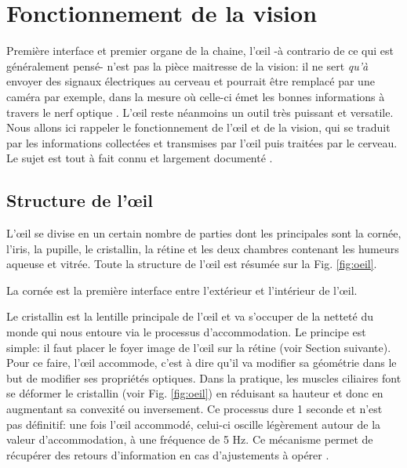 \chapter{Fonctionnement de la vision}
\par Première interface et premier organe de la chaine, l'œil -à contrario de ce qui est généralement pensé- n'est pas la pièce maitresse de la vision: il ne sert \textit{qu'à} envoyer des signaux électriques au cerveau et pourrait être remplacé par une caméra par exemple, dans la mesure où celle-ci émet les bonnes informations à travers le nerf optique \citep{dobelle_artificial_2000}. L'œil reste néanmoins un outil très puissant et versatile. Nous allons ici rappeler le fonctionnement de l'œil et de la vision, qui se traduit par les informations collectées et transmises par l'œil puis traitées par le cerveau. Le sujet est tout à fait connu et largement documenté \citep{fairchild_human_2005,wandell_foundations_1995,gross_human_2008,driscoll_eyes_1978}.

	\section{Structure de l'œil}
	\par L'œil se divise en un certain nombre de parties dont les principales sont la cornée, l'iris, la pupille, le cristallin, la rétine et les deux chambres contenant les humeurs aqueuse et vitrée. Toute la structure de l'œil est résumée sur la Fig. \ref{fig:oeil}.
	
	\par La cornée est la première interface entre l'extérieur et l'intérieur de l'œil.
	
	\par Le cristallin est la lentille principale de l'œil et va s'occuper de la netteté du monde qui nous entoure via le processus d'accommodation. Le principe est simple: il faut placer le foyer image de l'œil sur la rétine (voir Section suivante). Pour ce faire, l'œil accommode, c'est à dire qu'il va modifier sa géométrie dans le but de modifier ses propriétés optiques. Dans la pratique, les muscles ciliaires font se déformer le cristallin (voir Fig. \ref{fig:oeil}) en réduisant sa hauteur et donc en augmentant sa convexité ou inversement. Ce processus dure 1 seconde et n'est pas définitif: une fois l'œil accommodé, celui-ci oscille légèrement autour de la valeur  d'accommodation, à une fréquence de 5 Hz. Ce mécanisme permet de récupérer des retours d'information en cas d'ajustements à opérer \citep{gross_human_2008}.
	
